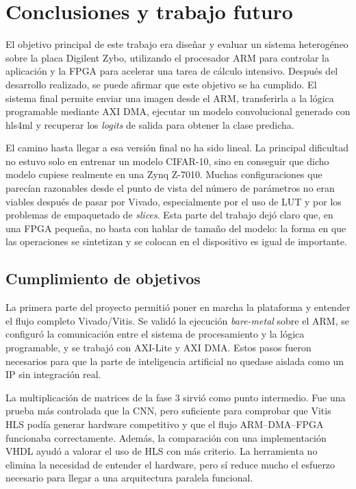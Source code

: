 \chapter{Conclusiones y trabajo futuro}
\label{cap:conclusiones}

El objetivo principal de este trabajo era diseñar y evaluar un sistema heterogéneo sobre la placa
Digilent Zybo, utilizando el procesador \ac{ARM} para controlar la aplicación y la
\ac{FPGA} para acelerar
una tarea de cálculo intensivo. Después del desarrollo realizado, se puede afirmar que este
objetivo se ha cumplido. El sistema final permite enviar una imagen desde el \ac{ARM},
transferirla a
la lógica programable mediante \ac{AXI} \ac{DMA}, ejecutar un modelo convolucional
generado con hls4ml y
recuperar los \textit{logits} de salida para obtener la clase predicha.

El camino hasta llegar a esa versión final no ha sido lineal. La principal dificultad no estuvo
solo en entrenar un modelo \ac{CIFAR}-10, sino en conseguir que dicho modelo cupiese
realmente en una
Zynq Z-7010. Muchas configuraciones que parecían razonables desde el punto de vista del número de
parámetros no eran viables después de pasar por Vivado, especialmente por el uso de
\ac{LUT} y por los
problemas de empaquetado de \textit{slices}. Esta parte del trabajo dejó claro que, en
una \ac{FPGA} pequeña, no
basta con hablar de tamaño del modelo: la forma en que las operaciones se sintetizan y se colocan
en el dispositivo es igual de importante.

\section{Cumplimiento de objetivos}

La primera parte del proyecto permitió poner en marcha la plataforma y entender el flujo completo
Vivado/Vitis. Se validó la ejecución \textit{bare-metal} sobre el \ac{ARM}, se configuró
la comunicación entre
el sistema de procesamiento y la lógica programable, y se trabajó con \ac{AXI}-Lite y AXI
\ac{DMA}. Estos
pasos fueron necesarios para que la parte de inteligencia artificial no quedase aislada
como un \ac{IP}
sin integración real.

La multiplicación de matrices de la fase 3 sirvió como punto intermedio. Fue una prueba más
controlada que la \ac{CNN}, pero suficiente para comprobar que Vitis \ac{HLS} podía generar hardware
competitivo y que el flujo \ac{ARM}--\ac{DMA}--\ac{FPGA} funcionaba correctamente.
Además, la comparación con una
implementación \ac{VHDL} ayudó a valorar el uso de \ac{HLS} con más criterio. La
herramienta no elimina la
necesidad de entender el hardware, pero sí reduce mucho el esfuerzo necesario para llegar a una
arquitectura paralela funcional.

